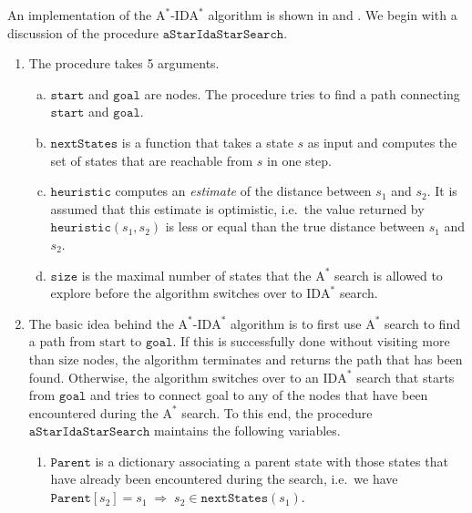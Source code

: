 An implementation of the $\mathrm{A}^*$-$\mathrm{IDA}^*$ algorithm is shown in 
and .  We begin with a discussion of the procedure $\mathtt{aStarIdaStarSearch}$.
\begin{enumerate}
\item The procedure takes 5 arguments.
      \begin{enumerate}[(a)]
      \item $\mathtt{start}$ and $\mathtt{goal}$ are nodes.  The procedure tries to find a path connecting 
            $\mathtt{start}$ and $\mathtt{goal}$.
      \item $\mathtt{nextStates}$ is a function that takes a state $s$ as input and computes the set of states that are
            reachable from $s$ in one step. 
      \item $\mathtt{heuristic}$ computes an \emph{estimate} of the distance between $s_1$ and $s_2$.  It is
            assumed that this estimate is optimistic, i.e.~the value returned by $\mathtt{heuristic}(s_1, s_2)$ 
            is less or equal than the true distance between $s_1$ and $s_2$.
      \item $\mathtt{size}$ is the maximal number of states that the $\mathrm{A}^*$ search is allowed to
            explore before the algorithm switches over to $\mathrm{IDA}^*$ search.
      \end{enumerate}
\item The basic idea behind the $\mathrm{A}^*$-$\mathrm{IDA}^*$ algorithm is to first use $\mathrm{A}^*$ search
      to find a path from $\mathrm{start}$ to $\mathtt{goal}$.  If this is successfully done without visiting
      more than $\mathrm{size}$ nodes, the algorithm terminates and returns the path that has been found.  
      Otherwise, the algorithm switches over to an $\mathrm{IDA}^*$ search that starts from $\mathtt{goal}$ and
      tries to connect goal to any of the nodes that have been encountered during the $\mathrm{A}^*$ search.
      To this end, the procedure $\mathtt{aStarIdaStarSearch}$ maintains the following variables.
      \begin{enumerate}
      \item $\mathtt{Parent}$ is a dictionary associating a parent state with those states that have already been
            encountered during the search, i.e.~we have
            \\[0.2cm]
            \hspace*{1.3cm}
            $\mathtt{Parent}[s_2] = s_1 \;\Rightarrow\; s_2 \in \mathtt{nextStates}(s_1)$.

\end{enumerate}
\end{enumerate}
